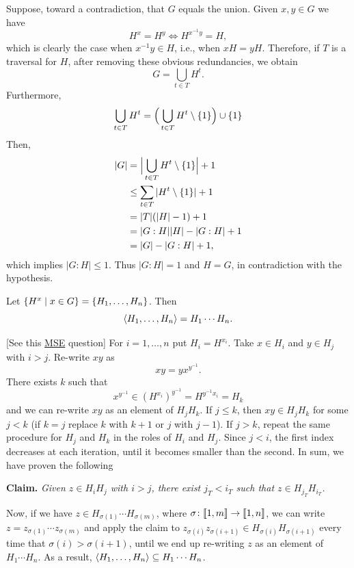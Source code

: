 \begin{solution} Suppose, toward a contradiction, that $G$ equals the union. Given $x,y\in G$ we have
$$
    H^x=H^y\iff H^{x^{-1}y}=H,
$$
which is clearly the case when $x^{-1}y\in H$, i.e., when $xH=yH$. Therefore, if $T$ is a traversal for $H$, after removing these obvious redundancies, we obtain
$$
    G = \bigcup_{t\in T}H^t.
$$
Furthermore,
$$
    \bigcup_{t\in T}H^t = \Big(\bigcup_{t\in T}H^t\setminus\{1\}\Big)\cup\{1\}
$$
Then,
\begin{align*}
    |G| &= \Big|\bigcup_{t\in T}H^t\setminus\{1\}\Big|+1\\
        &\le \sum_{t\in T}|H^t\setminus\{1\}|+1\\
        &= |T|(|H|-1) + 1\\
        &= |G:H||H|-|G:H| + 1\\
        &= |G| - |G:H| + 1,
\end{align*}
which implies $|G:H|\le1$. Thus $|G:H|=1$ and $H=G$, in contradiction with the hypothesis.  \end{solution}


\begin{exr}\label{exercise-1.1.13}
    Let\/ $\{H^x\mid x\in G\} = \{H_1,\dots, H_n\}$. Then
    $$
        \langle H_1,\dots,H_n\rangle = H_1\cdots H_n.
    $$
\end{exr}

\begin{solution} {[See this \href{https://math.stackexchange.com/q/4781892/269050}{MSE} question]} For $i=1,\dots, n$ put $H_i=H^{x_i}$. Take $x\in H_i$ and $y\in H_j$ with $i>j$. Re-write $xy$ as
$$
    xy=yx^{y^{-1}}.
$$
There exists $k$ such that
$$
    x^{y^{-1}}\in(H^{x_i})^{y^{-1}}=H^{y^{-1}x_i}=H_k
$$
and we can re-write $xy$ as an element of $H_jH_k$. If $j\le k$, then $xy\in H_jH_k$ for some $j<k$ (if $k=j$ replace $k$ with $k+1$ or $j$ with $j-1$). If $j>k$, repeat the same procedure for $H_j$ and $H_k$ in the roles of $H_i$ and $H_j$. Since $j<i$, the first index decreases at each iteration, until it becomes smaller than the second. In sum, we have proven the following

\textbf{Claim.} \textit{Given $z\in H_iH_j$ with $i>j$, there exist $j_T<i_T$ such that $z\in H_{j_T}H_{i_T}$.}

Now, if we have $z\in H_{\sigma(1)}\cdots H_{\sigma(m)}$, where $\sigma\colon\llbracket1,m\rrbracket\to\llbracket1,n\rrbracket$, we can write $z=z_{\sigma(1)}\cdots z_{\sigma(m)}$ and apply the claim to $z_{\sigma(i)}z_{\sigma(i+1)}\in H_{\sigma(i)}H_{\sigma(i+1)}$ every time that $\sigma(i)>\sigma(i+1)$, until we end up re-writing $z$ as an element of $H_1\cdots H_n$. As a result, $\langle H_1,\dots,H_n\rangle\subseteq H_1\cdots H_n$.  \end{solution}


